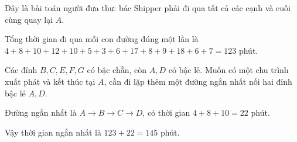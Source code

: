 \begin{baitap}
\begin{center}
\begin{tikzpicture}[line cap=round, line join=round, >=stealth, scale=0.95]
		\end{tikzpicture}
	\end{center}
	\begin{traloi}
		
		Đây là bài toán người đưa thư: bác Shipper phải đi qua tất cả các cạnh và cuối cùng quay lại \(A\).
		
		Tổng thời gian đi qua mỗi con đường đúng một lần là
		\(4+8+10+12+10+5+3+6+17+8+9+18+6+7=123\) phút.
		
		Các đỉnh \(B,C,E,F,G\) có bậc chẵn, còn \(A,D\) có bậc lẻ. Muốn có một chu trình xuất phát và kết thúc tại \(A\), cần đi lặp thêm một đường ngắn nhất nối hai đỉnh bậc lẻ \(A,D\).
		
		Đường ngắn nhất là \(A\to B\to C\to D\), có thời gian \(4+8+10=22\) phút.
		
		Vậy thời gian ngắn nhất là \(123+22=145\) phút.
	\end{traloi}
\end{baitap}

